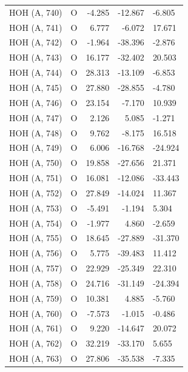 \begin{longtable}{@{}lcrr@{}}
  \cmidrule(r){1-5}
  HOH (A, 740) & O & -4.285 & -12.867 & -6.805 \\
  \cmidrule(r){1-5}
  HOH (A, 741) & O & 6.777 & -6.072 & 17.671 \\
  \cmidrule(r){1-5}
  HOH (A, 742) & O & -1.964 & -38.396 & -2.876 \\
  \cmidrule(r){1-5}
  HOH (A, 743) & O & 16.177 & -32.402 & 20.503 \\
  \cmidrule(r){1-5}
  HOH (A, 744) & O & 28.313 & -13.109 & -6.853 \\
  \cmidrule(r){1-5}
  HOH (A, 745) & O & 27.880 & -28.855 & -4.780 \\
  \cmidrule(r){1-5}
  HOH (A, 746) & O & 23.154 & -7.170 & 10.939 \\
  \cmidrule(r){1-5}
  HOH (A, 747) & O & 2.126 & 5.085 & -1.271 \\
  \cmidrule(r){1-5}
  HOH (A, 748) & O & 9.762 & -8.175 & 16.518 \\
  \cmidrule(r){1-5}
  HOH (A, 749) & O & 6.006 & -16.768 & -24.924 \\
  \cmidrule(r){1-5}
  HOH (A, 750) & O & 19.858 & -27.656 & 21.371 \\
  \cmidrule(r){1-5}
  HOH (A, 751) & O & 16.081 & -12.086 & -33.443 \\
  \cmidrule(r){1-5}
  HOH (A, 752) & O & 27.849 & -14.024 & 11.367 \\
  \cmidrule(r){1-5}
  HOH (A, 753) & O & -5.491 & -1.194 & 5.304 \\
  \cmidrule(r){1-5}
  HOH (A, 754) & O & -1.977 & 4.860 & -2.659 \\
  \cmidrule(r){1-5}
  HOH (A, 755) & O & 18.645 & -27.889 & -31.370 \\
  \cmidrule(r){1-5}
  HOH (A, 756) & O & 5.775 & -39.483 & 11.412 \\
  \cmidrule(r){1-5}
  HOH (A, 757) & O & 22.929 & -25.349 & 22.310 \\
  \cmidrule(r){1-5}
  HOH (A, 758) & O & 24.716 & -31.149 & -24.394 \\
  \cmidrule(r){1-5}
  HOH (A, 759) & O & 10.381 & 4.885 & -5.760 \\
  \cmidrule(r){1-5}
  HOH (A, 760) & O & -7.573 & -1.015 & -0.486 \\
  \cmidrule(r){1-5}
  HOH (A, 761) & O & 9.220 & -14.647 & 20.072 \\
  \cmidrule(r){1-5}
  HOH (A, 762) & O & 32.219 & -33.170 & 5.655 \\
  \cmidrule(r){1-5}
  HOH (A, 763) & O & 27.806 & -35.538 & -7.335 \\

\end{longtable}
